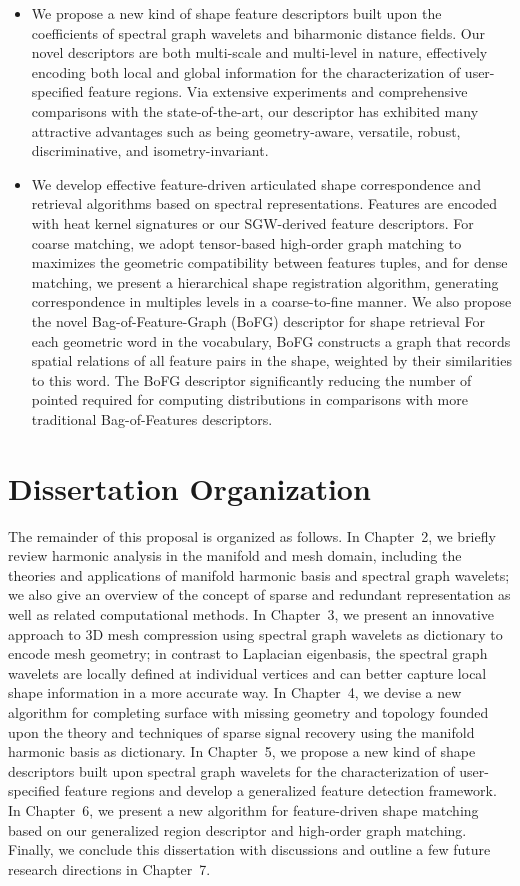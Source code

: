 \begin{itemize}
\item We propose a new kind of shape feature descriptors built upon the
  coefficients of spectral graph wavelets and biharmonic distance fields.
  Our novel descriptors are both multi-scale and multi-level in nature,
  effectively encoding both local and global information
  for the characterization of user-specified feature regions.
  Via extensive experiments and comprehensive comparisons with the state-of-the-art,
  our descriptor has exhibited many attractive advantages such as being geometry-aware,
  versatile, robust, discriminative, and isometry-invariant.

\item We develop effective feature-driven articulated shape
correspondence and retrieval algorithms based on spectral
representations. Features are encoded with heat kernel signatures
or our SGW-derived feature descriptors. For coarse matching, we adopt
tensor-based high-order graph matching to maximizes the
geometric compatibility between features tuples, and for dense matching,
we present a hierarchical shape registration algorithm, generating
correspondence in multiples levels in a coarse-to-fine manner. We also
propose the novel Bag-of-Feature-Graph (BoFG) descriptor for shape retrieval
For each geometric word in the vocabulary, BoFG constructs a graph that records
spatial relations of all feature pairs in the shape, weighted by their
similarities to this word. The BoFG descriptor significantly reducing the number
of pointed required for computing distributions in comparisons with more traditional
Bag-of-Features descriptors.

\end{itemize}

\section{Dissertation Organization}
The remainder of this proposal is organized as follows.
In Chapter~2, we briefly review harmonic analysis in the manifold and mesh
domain, including the theories and applications of manifold harmonic basis
and spectral graph wavelets; we also give an overview of the concept of
sparse and redundant representation as well as related computational methods.
In Chapter~3, we present an innovative approach to 3D mesh compression
using spectral graph wavelets as dictionary to encode mesh geometry; in
contrast to Laplacian eigenbasis, the spectral graph wavelets are locally
defined at individual vertices and can better capture local shape
information in a more accurate way.
In Chapter~4, we devise a new algorithm for completing surface with missing geometry
and topology founded upon the theory and techniques of sparse signal recovery
using the manifold harmonic basis as dictionary.
In Chapter~5, we propose a new kind of shape descriptors built upon
spectral graph wavelets for the characterization of user-specified feature regions
and develop a generalized feature detection framework.
In Chapter~6, we present a new algorithm for feature-driven shape matching based on
our generalized region descriptor and high-order graph matching.
Finally, we conclude this dissertation with discussions and outline a few future
research directions in Chapter~7.   